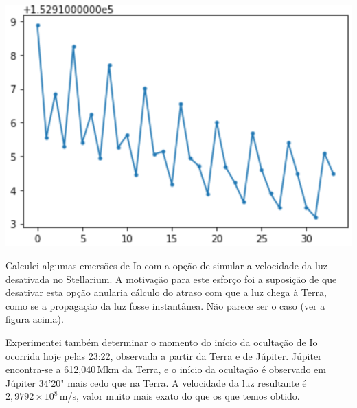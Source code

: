 \documentclass[]{article}
\begin{document}
\begin{center}
  \includegraphics{figs/2024-12-02.png}
\end{center}
Calculei algumas emersões de Io com a opção de simular a velocidade da luz
desativada no Stellarium. A motivação para este esforço foi a suposição de que
desativar esta opção anularia cálculo do atraso com que a luz chega à Terra,
como se a propagação da luz fosse instantânea. Não parece ser o caso (ver a
figura acima).

Experimentei também determinar o momento do início da ocultação de Io ocorrida
hoje pelas 23:22, observada a partir da Terra e de Júpiter. Júpiter encontra-se
a 612,040\,Mkm da Terra, e o início da ocultação é observado em Júpiter 34'20"{}
mais cedo que na Terra. A velocidade da luz resultante é
$2,9792\times10^8$\,m/s, valor muito mais exato do que os que temos obtido.
\end{document}
